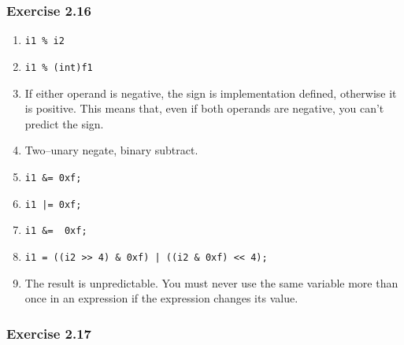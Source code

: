   

  \subsubsection*{Exercise 2.16}

   \begin{enumerate}
    \item \texttt{i1 \% i2}
    \item \texttt{i1 \% (int)f1}

    \item If either operand is negative, the sign is implementation defined,
     otherwise it is positive. This means that, even if both operands are
     negative, you can't predict the sign.

    \item Two--unary negate, binary subtract.

    \item \texttt{i1 \&= 0xf;}
    \item \texttt{i1 |= 0xf;}
    \item \texttt{i1 \&= ~0xf;}
    \item \texttt{i1 = ((i2 >> 4) \& 0xf) | ((i2 \& 0xf) << 4);}

    \item The result is unpredictable. You must never use the same variable more
     than once in an expression if the expression changes its value.
   \end{enumerate}

  

  \subsubsection*{Exercise 2.17}

